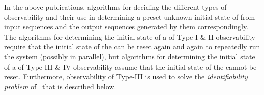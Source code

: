 \begin{itemize}
\end{itemize}

In the above publications, algorithms for deciding the different types of observability  and their use in determining a preset unknown initial state of  {\BCN}  from input sequences and the output sequences generated by them correspondingly. The algorithms for determining  the initial state of a {\BCN} of {\sf Type-I \& II} observability require that the initial state of the {\BCN} can be reset again and again to repeatedly run the system (possibly in parallel), but  algorithms for determining  the initial state of a {\BCN} of {\sf Type-III \& IV}  observability assume that the initial state of the {\BCN} cannot be reset. Furthermore,  observability of {\sf Type-III}  is used to solve the  {\em identifiability problem} of \BCNs\, that is described below.

